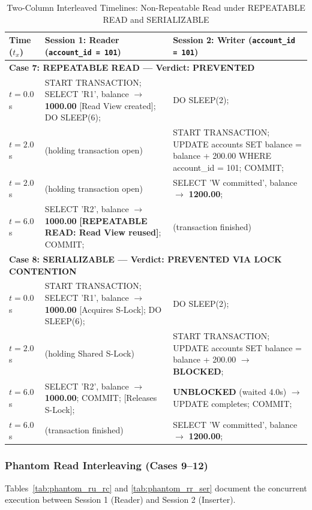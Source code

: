 \documentclass[sigconf, pbalance, nonacm]{acmart}
\begin{document}
\begin{table}[t]
\centering
\small
\caption{Two-Column Interleaved Timelines: Non-Repeatable Read under REPEATABLE READ and SERIALIZABLE}
\label{tab:nonrep_rr_ser}
\begin{tabularx}{\textwidth}{p{1.8cm} X X}
\toprule
\textbf{Time ($t_x$)} & \textbf{Session 1: Reader (\texttt{account\_id = 101})} & \textbf{Session 2: Writer (\texttt{account\_id = 101})} \\
\midrule
\multicolumn{3}{l}{\textbf{Case 7: REPEATABLE READ --- Verdict: PREVENTED}} \\
$t = 0.0$s & START TRANSACTION; SELECT 'R1', balance $\rightarrow$ \textbf{1000.00} [Read View created]; DO SLEEP(6); & DO SLEEP(2); \\
$t = 2.0$s & (holding transaction open) & START TRANSACTION; UPDATE accounts SET balance = balance + 200.00 WHERE account\_id = 101; COMMIT; \\
$t = 2.0$s & (holding transaction open) & SELECT 'W committed', balance $\rightarrow$ \textbf{1200.00}; \\
$t = 6.0$s & SELECT 'R2', balance $\rightarrow$ \textbf{1000.00} \textbf{[REPEATABLE READ: Read View reused]}; COMMIT; & (transaction finished) \\
\midrule
\multicolumn{3}{l}{\textbf{Case 8: SERIALIZABLE --- Verdict: PREVENTED VIA LOCK CONTENTION}} \\
$t = 0.0$s & START TRANSACTION; SELECT 'R1', balance $\rightarrow$ \textbf{1000.00} [Acquires S-Lock]; DO SLEEP(6); & DO SLEEP(2); \\
$t = 2.0$s & (holding Shared S-Lock) & START TRANSACTION; UPDATE accounts SET balance = balance + 200.00 $\rightarrow$ \textbf{BLOCKED}; \\
$t = 6.0$s & SELECT 'R2', balance $\rightarrow$ \textbf{1000.00}; COMMIT; [Releases S-Lock]; & \textbf{UNBLOCKED} (waited 4.0s) $\rightarrow$ UPDATE completes; COMMIT; \\
$t = 6.0$s & (transaction finished) & SELECT 'W committed', balance $\rightarrow$ \textbf{1200.00}; \\
\bottomrule
\end{tabularx}
\end{table}

\subsubsection{Phantom Read Interleaving (Cases 9--12)}
Tables~\ref{tab:phantom_ru_rc} and \ref{tab:phantom_rr_ser} document the concurrent execution between Session 1 (Reader) and Session 2 (Inserter).
\end{document}
